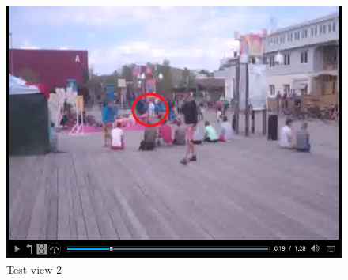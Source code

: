 \begin{figure}[ht!]
\begin{center}
	\includegraphics[scale=0.8]{Hoverboard_2.png}
	\caption{Test view 2}
	\label{fig:testview2}
\end{center}
\end{figure}